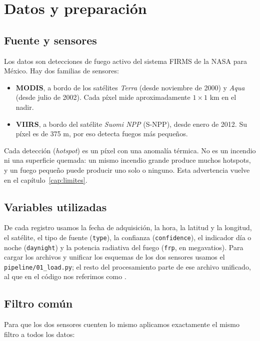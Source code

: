 \chapter{Datos y preparación}\label{cap:datos}

\section{Fuente y sensores}

Los datos son detecciones de fuego activo del sistema FIRMS de la NASA para México. Hay dos familias de sensores:

\begin{itemize}
  \item \textbf{MODIS}, a bordo de los satélites \emph{Terra} (desde noviembre de 2000) y \emph{Aqua} (desde julio de 2002). Cada píxel mide aproximadamente $1\times1$ km en el nadir.
  \item \textbf{VIIRS}, a bordo del satélite \emph{Suomi NPP} (S-NPP), desde enero de 2012. Su píxel es de 375 m, por eso detecta fuegos más pequeños.
\end{itemize}

Cada detección (\emph{hotspot}) es un píxel con una anomalía térmica. No es un incendio ni una superficie quemada: un mismo incendio grande produce muchos hotspots, y un fuego pequeño puede producir uno solo o ninguno. Esta advertencia vuelve en el capítulo~\ref{cap:limites}.

\section{Variables utilizadas}

De cada registro usamos la fecha de adquisición, la hora, la latitud y la longitud, el satélite, el tipo de fuente (\texttt{type}), la confianza (\texttt{confidence}), el indicador día o noche (\texttt{daynight}) y la potencia radiativa del fuego (\texttt{frp}, en megavatios). Para cargar los archivos y unificar los esquemas de los dos sensores usamos el \texttt{pipeline/01\_load.py}; el resto del procesamiento parte de ese archivo unificado, al que en el código nos referimos como \dato.

\section{Filtro común}

Para que los dos sensores cuenten lo mismo aplicamos exactamente el mismo filtro a todos los datos:

